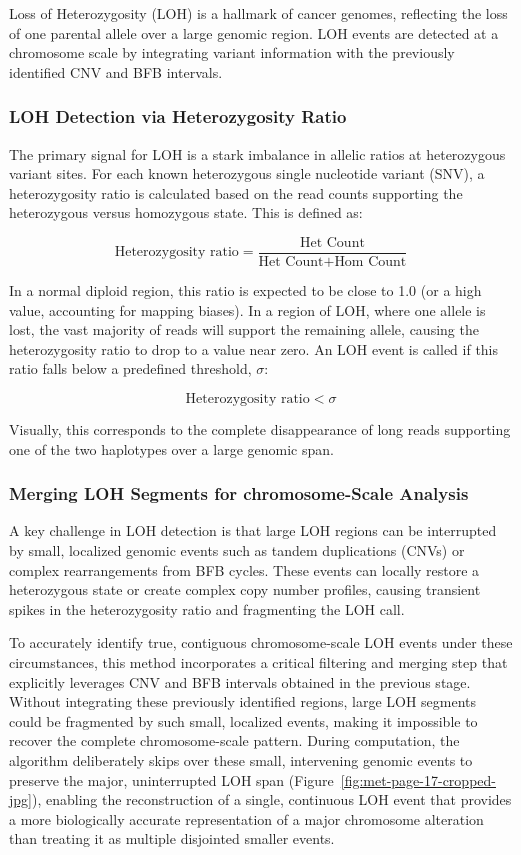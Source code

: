 \documentclass[pdflatex,sn-nature]{sn-jnl}
\begin{document}
Loss of Heterozygosity (LOH) is a hallmark of cancer genomes, reflecting the loss of one parental allele over a large genomic region. LOH events are detected at a chromosome scale by integrating variant information with the previously identified CNV and BFB intervals.

\subsubsection{LOH Detection via Heterozygosity Ratio}\label{loh-detection-via-heterozygosity-ratio}

The primary signal for LOH is a stark imbalance in allelic ratios at heterozygous variant sites. For each known heterozygous single nucleotide variant (SNV), a heterozygosity ratio is calculated based on the read counts supporting the heterozygous versus homozygous state. This is defined as:

\[
\text{Heterozygosity ratio} = \frac{\text{Het Count}}{\text{Het Count} + \text{Hom Count}}
\]

In a normal diploid region, this ratio is expected to be close to 1.0 (or a high value, accounting for mapping biases). In a region of LOH, where one allele is lost, the vast majority of reads will support the remaining allele, causing the heterozygosity ratio to drop to a value near zero. An LOH event is called if this ratio falls below a predefined threshold, $\sigma$:

\[
\text{Heterozygosity ratio} < \sigma
\]

Visually, this corresponds to the complete disappearance of long reads supporting one of the two haplotypes over a large genomic span.

\subsubsection{Merging LOH Segments for chromosome-Scale Analysis}\label{merging-loh-segments-for-chromosome-scale-analysis}

A key challenge in LOH detection is that large LOH regions can be interrupted by small, localized genomic events such as tandem duplications (CNVs) or complex rearrangements from BFB cycles. These events can locally restore a heterozygous state or create complex copy number profiles, causing transient spikes in the heterozygosity ratio and fragmenting the LOH call.

To accurately identify true, contiguous chromosome-scale LOH events under these circumstances, this method incorporates a critical filtering and merging step that explicitly leverages CNV and BFB intervals obtained in the previous stage. Without integrating these previously identified regions, large LOH segments could be fragmented by such small, localized events, making it impossible to recover the complete chromosome-scale pattern. During computation, the algorithm deliberately skips over these small, intervening genomic events to preserve the major, uninterrupted LOH span (Figure~\ref{fig:met-page-17-cropped-jpg}), enabling the reconstruction of a single, continuous LOH event that provides a more biologically accurate representation of a major chromosome alteration than treating it as multiple disjointed smaller events.
\end{document}
